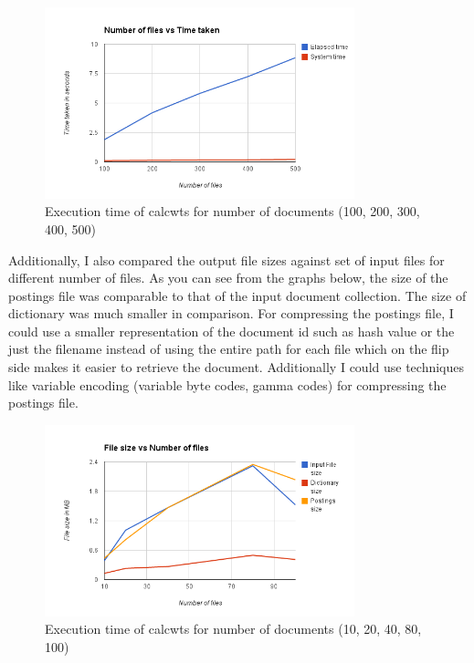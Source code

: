 \documentclass[paper=a4, fontsize=11pt]{scrartcl}
\numberwithin{equation}{section}		%
\numberwithin{figure}{section}			%
\numberwithin{table}{section}				%
\begin{document}
\begin{figure}[h] %
  \begin{center}
    \includegraphics[width=0.8\textwidth]{time_2.png}
  \end{center}
  \caption{Execution time of calcwts for number of documents (100, 200, 300, 400, 500)}
\end{figure}

Additionally, I also compared the output file sizes against set of input files for different number of files. As you can see from the graphs below, the size of the postings file was comparable to that of the input document collection. The size of dictionary was much smaller in comparison. For compressing the postings file, I could use a smaller representation of the document id such as hash value or the just the filename instead of using the entire path for each file which on the flip side makes it easier to retrieve the document. Additionally I could use techniques like variable encoding (variable byte codes, gamma codes)  \cite{comp} for compressing the postings file.   

\begin{figure}[h] %
  \begin{center}
    \includegraphics[width=0.8\textwidth]{size_1.png}
  \end{center}
  \caption{Execution time of calcwts for number of documents (10, 20, 40, 80, 100)}
\end{figure}
\end{document}
